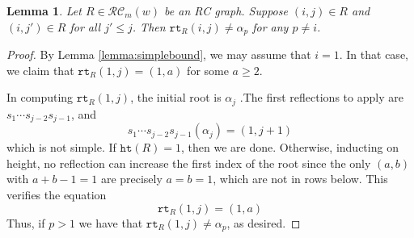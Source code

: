\documentclass{amsart}
\newtheorem{lemma}{Lemma}[subsection]
\theoremstyle{definition}
\theoremstyle{remark}
\numberwithin{equation}{subsection}
\newcommand{\wtt}{\mathtt{wt}}
\newcommand{\rtt}{\mathtt{rt}}
\newcommand{\hr}{\mathtt{ht}}
\newcommand{\RC}{\mathcal{RC}}
\newcommand{\code}{\mathfrak{c}}
\newcommand{\maxd}{\mathfrak{m}}
\begin{document}
\begin{lemma} \label{lemma:notsimpleatall}
Let $R\in \RC_m(w)$ be an RC graph. Suppose $(i,j)\in R$  and $(i,j')\in R$ for all $j'\leq j$. Then $\rtt_R(i,j)\neq \alpha_p$ for any $p\neq i$.
\end{lemma}
\begin{proof}
  
  By Lemma \ref{lemma:simplebound}, we may assume that $i=1$. In that case, we claim that $\rtt_R(1,j) = (1,a)$ for some $a\geq 2$. 
  
  In computing $\rtt_R(1,j)$, the initial root is $\alpha_j$ .The first reflections to apply are $s_1\cdots s_{j-2}s_{j-1}$, and 
  $$s_1\cdots s_{j-2}s_{j-1}(\alpha_j) = (1, j + 1)$$
  which is not simple. If $\hr(R) = 1$, then we are done. Otherwise, inducting on height, no reflection can increase the first index of the root since the only $(a,b)$ with $a+b-1=1$ are precisely $a=b=1$, which are not in rows below. This verifies the equation
  $$\rtt_R(1,j) = (1,a)$$
  Thus, if $p>1$ we have that $\rtt_R(1,j)\neq \alpha_p$, as desired.
\end{proof}



\end{document}
